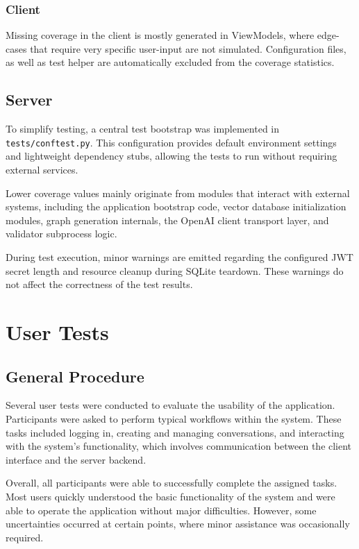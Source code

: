 \subsubsection{Client}
Missing coverage in the client is mostly generated in ViewModels, where edge-cases that require
very specific user-input are not simulated.
Configuration files, as well as test helper are automatically excluded from the coverage statistics.

\subsection{Server}
To simplify testing, a central test bootstrap was implemented in
\texttt{tests/conftest.py}.
This configuration provides default environment
settings and lightweight dependency stubs, allowing the tests to run without
requiring external services.

Lower coverage values mainly originate from modules that interact with
external systems, including the application bootstrap code, vector database
initialization modules, graph generation internals, the OpenAI client
transport layer, and validator subprocess logic.

During test execution, minor warnings are emitted regarding the configured
JWT secret length and resource cleanup during SQLite teardown. These warnings
do not affect the correctness of the test results.

\section{User Tests}

\subsection{General Procedure}

Several user tests were conducted to evaluate the usability of the application.
Participants were asked to perform typical workflows within the system.
These tasks included logging in, creating and managing conversations, and
interacting with the system's functionality, which involves communication
between the client interface and the server backend.

Overall, all participants were able to successfully complete the assigned tasks.
Most users quickly understood the basic functionality of the system and were
able to operate the application without major difficulties.
However, some
uncertainties occurred at certain points, where minor assistance was occasionally
required.

